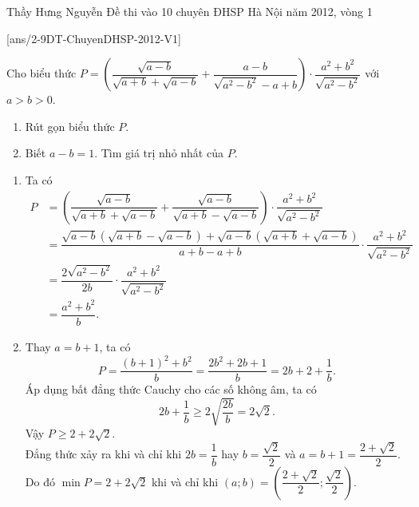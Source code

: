 \begin{name}
{Thầy  Hưng Nguyễn}
{Đề thi vào 10 chuyên ĐHSP Hà Nội năm 2012, vòng 1}
\end{name}
\setcounter{ex}{0}
[ans/2-9DT-ChuyenDHSP-2012-V1]
\begin{ex}%
   	Cho biểu thức $P=\left( \dfrac{\sqrt{a-b}}{\sqrt{a+b}+\sqrt{a-b}}+\dfrac{a-b}{\sqrt{a^2-b^2}-a+b}\right) \cdot\dfrac{a^2+b^2}{\sqrt{a^2-b^2}}$ với $a>b>0$.
   	\begin{enumerate}
   		\item Rút gọn biểu thức $P$.
   		\item Biết $a-b=1$. Tìm giá trị nhỏ nhất của $P$.
   	\end{enumerate}
    \loigiai
    {
   	\begin{enumerate}
   		\item Ta có\\
   		$\begin{aligned}
   		P&=\left( \dfrac{\sqrt{a-b}}{\sqrt{a+b}+\sqrt{a-b}}+\dfrac{\sqrt{a-b}}{\sqrt{a+b}-\sqrt{a-b}}\right) \cdot\dfrac{a^2+b^2}{\sqrt{a^2-b^2}}\\
   		&=\dfrac{\sqrt{a-b}\left( \sqrt{a+b}-\sqrt{a-b}\right) +\sqrt{a-b}\left( \sqrt{a+b}+\sqrt{a-b}\right) }{a+b-a+b}\cdot\dfrac{a^2+b^2}{\sqrt{a^2-b^2}}\\
   		&=\dfrac{2\sqrt{a^2-b^2}}{2b}\cdot\dfrac{a^2+b^2}{\sqrt{a^2-b^2}}\\
   		&=\dfrac{a^2+b^2}{b}.
   		\end{aligned}$
   		\item Thay $a=b+1$, ta có
   		$$P=\dfrac{(b+1)^2+b^2}{b}=\dfrac{2b^2+2b+1}{b}=2b+2+\dfrac{1}{b}.$$
   		Áp dụng bất đẳng thức Cauchy cho các số không âm, ta có
   		$$2b+\dfrac{1}{b}\ge 2\sqrt{\dfrac{2b}{b}}=2\sqrt{2}.$$
   		Vậy $P\ge 2+2\sqrt{2}$.\\
   		Đẳng thức xảy ra khi và chỉ khi $2b=\dfrac{1}{b}$ hay $b=\dfrac{\sqrt{2}}{2}$ và $a=b+1=\dfrac{2+\sqrt{2}}{2}$.\\
   		Do đó $\min P=2+2\sqrt{2}$ khi và chỉ khi $(a;b)=\left( \dfrac{2+\sqrt{2}}{2};\dfrac{\sqrt{2}}{2}\right).$
    \end{enumerate}
   	}
\end{ex}

